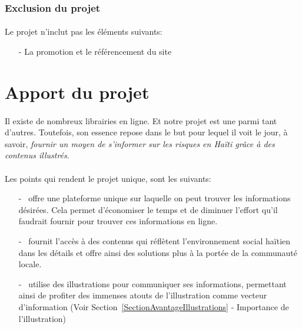 		\subsubsection{Exclusion du projet}
			\paragraph{} Le projet n'inclut pas les \'el\'ements suivants:
				\begin{itemize}
					\item[-] La promotion et le r\'ef\'erencement du site

				\end{itemize}



	\section{Apport du projet}
		\paragraph{}
			Il existe de nombreux librairies en ligne. Et notre projet est une parmi tant d'autres. Toutefois, son essence repose dans le but pour lequel il voit le jour, \`a savoir, \textit{fournir un moyen de s'informer sur les risques en Ha\"iti gr\^ace \`a des contenus illustr\'es}.

		\paragraph{} Les points qui rendent le projet unique, sont les suivants:\\
			\begin{itemize}
				\item[-] \projectName\ offre une plateforme unique sur laquelle on peut trouver les informations d\'esir\'ees. Cela permet d'\'economiser le temps et de diminuer l'effort qu'il faudrait fournir pour trouver ces informations en ligne.\\

				\item[-] \projectName\ fournit l'acc\`es \`a des contenus qui r\'efl\`etent l'environnement social ha\"itien dans les d\'etails et offre ainsi des solutions plus \`a la port\'ee de la communaut\'e locale.\\
				
				\item[-] \projectName\ utilise des illustrations pour communiquer ses informations, permettant ainsi de profiter des immenses atouts de l'illustration comme vecteur d'information (Voir Section~\ref{SectionAvantageIllustrations} - Importance de l'illustration)
			\end{itemize}